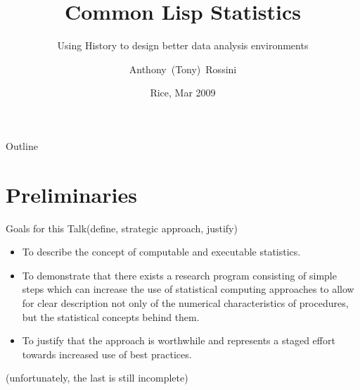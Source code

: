 \documentclass{beamer}
\title[CLS]{Common Lisp Statistics}
\subtitle{Using History to design better data analysis environments}
\author[Rossini]{Anthony~(Tony)~Rossini}
\institute[Novartis and University of Washington] %
{
  Group Head, Modeling and Simulation\\
  Novartis Pharma AG, Switzerland
  \and
  Affiliate Assoc Prof, Biomedical and Health Informatics\\
  University of Washington, USA}
\date[Rice 09]{Rice, Mar 2009}
\begin{document}
\begin{frame}
  \titlepage
\end{frame}

\begin{frame}{Outline}
  \tableofcontents
\end{frame}




\section{Preliminaries}

\begin{frame}{Goals for this Talk}{(define, strategic approach,
    justify)}

  \begin{itemize}
  \item To describe the concept of \alert{computable and executable
      statistics}.

  \item To demonstrate that \alert{there exists a research program}
    consisting of simple steps which can increase the use of
    statistical computing approaches to allow for clear description
    not only of the numerical characteristics of procedures, but the
    statistical concepts behind them.

  \item To justify that the \alert{approach is worthwhile} and
    represents a staged effort towards \alert{increased use of best
      practices}.
  \end{itemize}
  (unfortunately, the last is still incomplete)
\end{frame}
\end{document}
